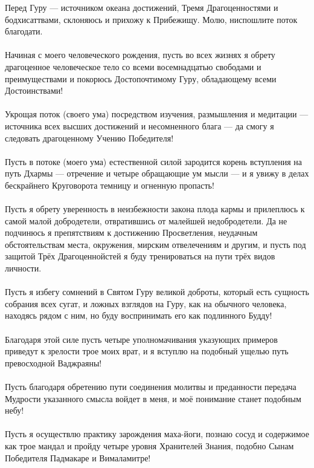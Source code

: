 Перед Гуру — источником океана достижений,
Тремя Драгоцен\-ностями и бодхисаттвами,
склоняюсь и прихожу к Прибежищу.
Молю, ниспошлите поток благодати.\\
\\
Начиная с моего человеческого рождения,
пусть во всех жизнях я обрету драгоценное человеческое тело
со всеми восемнадцатью свободами и преимуществами
и покорюсь Дос\-топочтимому Гуру,
обладающему всеми Достоинствами!\\
\\
Укрощая поток (своего ума) посредством изучения,
размышле\-ния и медитации — источника всех
высших достижений и несомненного блага —
да смогу я следовать драгоценному Учению Победителя!\\
\\
Пусть в потоке (моего ума) естественной силой
зародится корень вступления на путь Дхармы —
отречение и четыре обращающие ум мысли —
и я увижу в делах бескрайнего Круго\-ворота
темницу и огненную пропасть!\\
\\
Пусть я обрету уверенность в неизбежности закона плода кармы
и прилеплюсь к самой малой добродетели,
отвратившись от малейшей недобродетели.
Да не подчинюсь я препятствиям к достижению Просветления,
неудачным обстоятельствам места, окружения,
мирским отвелечениям и другим, и пусть под защитой
Трёх Драгоценнойстей я буду тренироваться
на пути трёх видов личности.\\
\\
Пусть я избегу сомнений в Святом Гуру великой доброты,
который есть сущность собрания всех сугат,
и ложных взглядов на Гуру, как на обычного человека,
находясь рядом с ним, но буду воспринимать его как
подлинного Будду!\\
\\
Благодаря этой силе пусть четыре уполномачивания
указующих примеров приведут к зрелости трое моих врат,
и я вступлю на подобный ущелью путь превосходной Ваджраяны!\\
\\
Пусть благодаря обретению пути соединения молитвы и предан\-ности
передача Мудрости указанного смысла войдет в меня,
и моё понимание станет подобным небу!\\
\\
Пусть я осуществлю практику зарождения маха-йоги,
познаю сосуд и содержимое как трое мандал и пройду четыре
уровня Хранителей Знания, подобно Сынам Победителя
Падмакаре и Вималамитре!\\
\\
